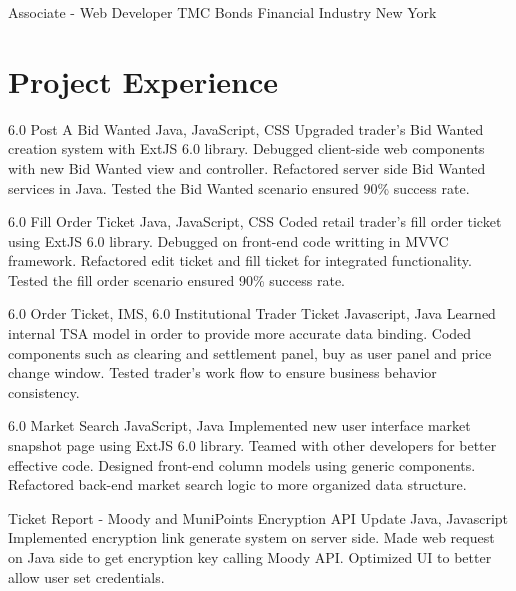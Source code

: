 \documentclass[11pt,a4paper,sans]{moderncv}   %
\begin{document}
{Associate - Web Developer}
{TMC Bonds}
{Financial Industry}
{New York}
{
}

\section{Project Experience}
\renewcommand{\baselinestretch}{1.25}

{6.0 Post A Bid Wanted}
{Java, JavaScript, CSS}
{}{}
{
	{Upgraded trader's Bid Wanted creation system with ExtJS 6.0 library.}
	\newline
	{Debugged client-side web components with new Bid Wanted view and controller.}
	\newline
	{Refactored server side Bid Wanted services in Java.}
	\newline
	{Tested the Bid Wanted scenario ensured 90\% success rate.}
}

{6.0 Fill Order Ticket}
{Java, JavaScript, CSS}
{}{}
{
	{Coded retail trader's fill order ticket using ExtJS 6.0 library.}
	\newline
	{Debugged on front-end code writting in MVVC framework.}
	\newline
	{Refactored edit ticket and fill ticket for integrated functionality.}
	\newline
	{Tested the fill order scenario ensured 90\% success rate.}
}

{6.0 Order Ticket, IMS, 6.0 Institutional Trader Ticket}
{Javascript, Java}
{}{}
{
	{Learned internal TSA model in order to provide more accurate data binding.}
	\newline
	{Coded components such as clearing and settlement panel, buy as user panel and price change window.}
	\newline
	{Tested trader's work flow to ensure business behavior consistency.}
}

{6.0 Market Search}
{JavaScript, Java}
{}{}
{
	{Implemented new user interface market snapshot page using ExtJS 6.0 library.}
	\newline
	{Teamed with other developers for better effective code.}
	\newline
	{Designed front-end column models using generic components.}
	\newline
	{Refactored back-end market search logic to more organized data structure.}
}

{Ticket Report - Moody and MuniPoints Encryption API Update}
{Java, Javascript}
{}{}
{
	{Implemented encryption link generate system on server side.}
	\newline
	{Made web request on Java side to get encryption key calling Moody API.}
	\newline
	{Optimized UI to better allow user set credentials.}
}
\end{document}
